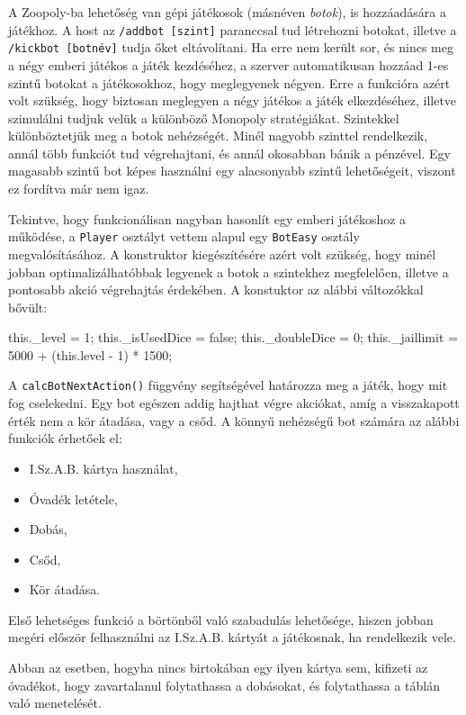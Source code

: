 
A Zoopoly-ba lehetőség van gépi játékosok (másnéven \textit{botok}), is hozzáadására a játékhoz. A host az \texttt{/addbot [szint]} paranccsal tud létrehozni botokat, illetve a \texttt{/kickbot [botnév]} tudja őket eltávolítani. Ha erre nem került sor, és nincs meg a négy emberi játékos a játék kezdéséhez, a szerver automatikusan hozzáad 1-es szintű botokat a játékosokhoz, hogy meglegyenek négyen. Erre a funkcióra azért volt szükség, hogy biztosan meglegyen a négy játékos a játék elkezdéséhez, illetve szimulálni tudjuk velük a különböző Monopoly stratégiákat. Szintekkel különböztetjük meg a botok nehézségét. Minél nagyobb szinttel rendelkezik, annál több funkciót tud végrehajtani, és annál okosabban bánik a pénzével. Egy magasabb szintű bot képes használni egy alacsonyabb szintű lehetőségeit, viszont ez fordítva már nem igaz.


Tekintve, hogy funkcionálisan nagyban hasonlít egy emberi játékoshoz a működése, a \texttt{Player} osztályt vettem alapul egy \texttt{BotEasy} osztály megvalósításához. A konstruktor kiegészítésére azért volt szükség, hogy minél jobban optimalizálhatóbbak legyenek a botok a szintekhez megfelelően, illetve a pontosabb akció végrehajtás érdekében.  A konstuktor az alábbi változókkal bővült:
\begin{javascript}
  this._level = 1;
  this._isUsedDice = false;
  this._doubleDice = 0;
  this._jaillimit = 5000 + (this.level - 1) * 1500;
\end{javascript}

A \texttt{calcBotNextAction()} függvény segítségével határozza meg a játék, hogy mit fog cselekedni. Egy bot egészen addig hajthat végre akciókat, amíg a visszakapott érték nem a kör átadása, vagy a csőd. A könnyű nehézségű bot számára az alábbi funkciók érhetőek el:
\begin{itemize}
\item I.Sz.A.B. kártya használat,
\item Óvadék letétele,
\item Dobás,
\item Csőd,
\item Kör átadása.
\end{itemize}

Első lehetséges funkció a börtönből való szabadulás lehetősége, hiszen jobban megéri először felhasználni az I.Sz.A.B. kártyát a játékosnak, ha rendelkezik vele.

Abban az esetben, hogyha nincs birtokában egy ilyen kártya sem, kifizeti az óvadékot, hogy zavartalanul folytathassa a dobásokat, és folytathassa a táblán való menetelését.

